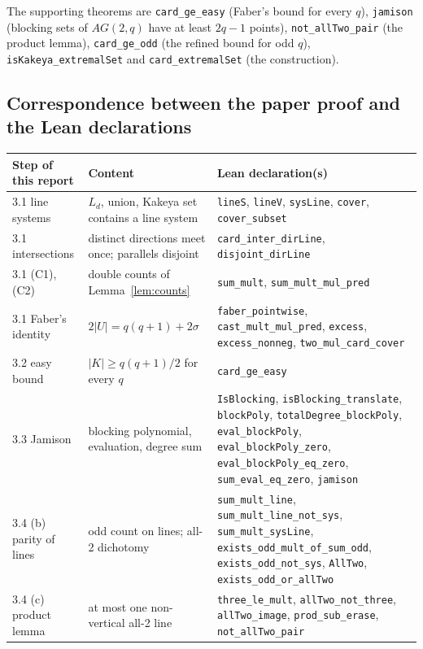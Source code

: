 \documentclass[11pt,a4paper]{article}
\theoremstyle{definition}
\theoremstyle{remark}
\begin{document}
The supporting theorems are \texttt{card\_ge\_easy} (Faber's bound for every $q$),
\texttt{jamison} (blocking sets of $AG(2,q)$ have at least $2q-1$ points), \texttt{not\_allTwo\_pair}
(the product lemma), \texttt{card\_ge\_odd} (the refined bound for odd $q$), \texttt{isKakeya\_extremalSet}
and \texttt{card\_extremalSet} (the construction).

\subsection{Correspondence between the paper proof and the Lean declarations}

{\footnotesize\sloppy
\begin{tabular}{@{}p{3.6cm}p{5.6cm}p{6.2cm}@{}}
\toprule
Step of this report & Content & Lean declaration(s) \\
\midrule
3.1 line systems & $L_d$, union, Kakeya set contains a line system &
\texttt{lineS}, \texttt{lineV}, \texttt{sysLine}, \texttt{cover}, \texttt{cover\_subset} \\
3.1 intersections & distinct directions meet once; parallels disjoint &
\texttt{card\_inter\_dirLine}, \texttt{disjoint\_dirLine} \\
3.1 (C1), (C2) & double counts of Lemma~\ref{lem:counts} &
\texttt{sum\_mult}, \texttt{sum\_mult\_mul\_pred} \\
3.1 Faber's identity & $2|U|=q(q+1)+2\sigma$ &
\texttt{faber\_pointwise}, \texttt{cast\_mult\_mul\_pred}, \texttt{excess}, \texttt{excess\_nonneg}, \texttt{two\_mul\_card\_cover} \\
3.2 easy bound & $|K|\ge q(q+1)/2$ for every $q$ & \texttt{card\_ge\_easy} \\
3.3 Jamison & blocking polynomial, evaluation, degree sum & \texttt{IsBlocking}, \texttt{isBlocking\_translate}, \texttt{blockPoly}, \texttt{totalDegree\_blockPoly}, \texttt{eval\_blockPoly}, \texttt{eval\_blockPoly\_zero}, \texttt{eval\_blockPoly\_eq\_zero}, \texttt{sum\_eval\_eq\_zero}, \texttt{jamison} \\
3.4 (b) parity of lines & odd count on lines; all-2 dichotomy &
\texttt{sum\_mult\_line}, \texttt{sum\_mult\_line\_not\_sys}, \texttt{sum\_mult\_sysLine}, \texttt{exists\_odd\_mult\_of\_sum\_odd}, \texttt{exists\_odd\_not\_sys}, \texttt{AllTwo}, \texttt{exists\_odd\_or\_allTwo} \\
3.4 (c) product lemma & at most one non-vertical all-2 line &
\texttt{three\_le\_mult}, \texttt{allTwo\_not\_three}, \texttt{allTwo\_image}, \texttt{prod\_sub\_erase}, \texttt{not\_allTwo\_pair} \\

\end{tabular}}
\end{document}
